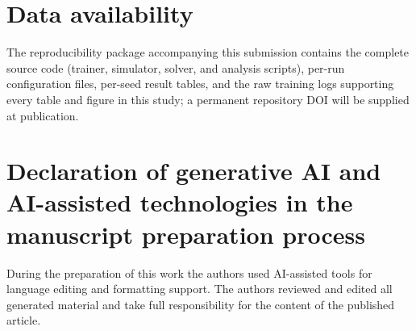 \documentclass[a4paper,fleqn]{cas-dc}
\begin{document}
\section*{Data availability}
The reproducibility package accompanying this submission contains the complete source code (trainer, simulator, solver, and analysis scripts), per-run configuration files, per-seed result tables, and the raw training logs supporting every table and figure in this study; a permanent repository DOI will be supplied at publication.

\section*{Declaration of generative AI and AI-assisted technologies in the manuscript preparation process}
During the preparation of this work the authors used AI-assisted tools for language editing and formatting support. The authors reviewed and edited all generated material and take full responsibility for the content of the published article.



\end{document}
